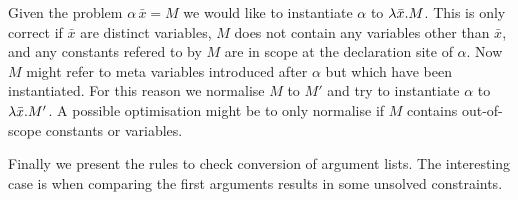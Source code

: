 
Given the problem $\alpha \, \bar x = M$ we would like to instantiate $\alpha$ to
$\lambda \bar x.{} M$. This is only correct if $\bar x$ are distinct variables, $M$
does not contain any variables other than $\bar x$, and any constants refered
to by $M$ are in scope at the declaration site of $\alpha$. Now $M$ might refer
to meta variables introduced after $\alpha$ but which have been instantiated.
For this reason we normalise $M$ to $M'$ and try to instantiate $\alpha$ to
$\lambda \bar x.{} M'$. A possible optimisation might be to only normalise if $M$
contains out-of-scope constants or variables.

Finally we present the rules to check conversion of argument lists. The
interesting case is when comparing the first arguments results in some unsolved
constraints.


